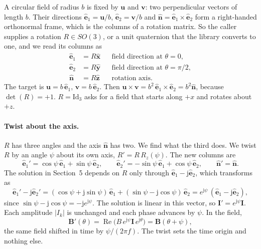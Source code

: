 \documentclass[11pt]{article}
\newcommand{\vb}[1]{\mathbf{#1}}
\newcommand{\uv}[1]{\hat{\mathbf{#1}}}
\newcommand{\jj}{\mathrm{j}}
\newcommand{\Id}{\mathrm{Id}}
\renewcommand{\Re}{\operatorname{Re}}
\begin{document}
A circular field of radius $b$ is fixed by $\vb u$ and $\vb v$: two perpendicular vectors of
length $b$. Their directions $\uv e_1 = \vb u/b$, $\uv e_2 = \vb v/b$ and
$\uv n = \uv e_1\times\uv e_2$ form a right-handed orthonormal frame, which is the columns of a
rotation matrix. So the caller supplies a rotation $R\in SO(3)$, or a unit quaternion that the
library converts to one, and we read its columns as
\begin{align}
  \uv e_1 &= R\uv x &&\text{field direction at }\theta=0,\nonumber\\
  \uv e_2 &= R\uv y &&\text{field direction at }\theta=\pi/2,\\
  \uv n &= R\uv z &&\text{rotation axis.}\nonumber
\end{align}
The target is $\vb u = b\,\uv e_1$, $\vb v = b\,\uv e_2$. Then
$\vb u\times\vb v = b^2\,\uv e_1\times\uv e_2 = b^2\uv n$, because $\det(R) = +1$. $R=\Id_3$ asks for a
field that starts along $+x$ and rotates about $+z$.

\paragraph{Twist about the axis.} $R$ has three angles and the axis $\uv n$ has two. We find what
the third does. We twist $R$ by an angle $\psi$ about its own axis, $R' = R\,R_z(\psi)$. The new
columns are
\begin{equation}
  \uv e_1' = \cos\psi\,\uv e_1 + \sin\psi\,\uv e_2,\qquad
  \uv e_2' = -\sin\psi\,\uv e_1 + \cos\psi\,\uv e_2,\qquad \uv n' = \uv n .
\end{equation}
The solution in Section~5 depends on $R$ only through $\uv e_1 - \jj\uv e_2$, which transforms as
\begin{equation}
  \uv e_1' - \jj\uv e_2'
  = (\cos\psi + \jj\sin\psi)\,\uv e_1 + (\sin\psi - \jj\cos\psi)\,\uv e_2
  = e^{\jj\psi}\,(\uv e_1 - \jj\uv e_2),
\end{equation}
since $\sin\psi - \jj\cos\psi = -\jj e^{\jj\psi}$. The solution is linear in this vector, so
$\vb I' = e^{\jj\psi}\vb I$. Each amplitude $|I_k|$ is unchanged and each phase advances by $\psi$.
In the field,
\begin{equation}
  \vb B'(\theta) = \Re\!\big(B\,e^{\jj\psi}\vb I\,e^{\jj\theta}\big) = \vb B(\theta+\psi),
\end{equation}
the same field shifted in time by $\psi/(2\pi f)$. The twist sets the time origin and nothing else.
\end{document}
